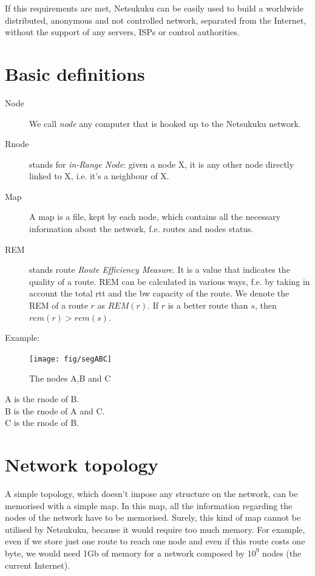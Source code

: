\documentclass[a4paper]{article}
\begin{document}
If this requirements are met, Netsukuku can be easily used to build a worldwide
distributed, anonymous and not controlled network, separated from the
Internet, without the support of any servers, ISPs or control authorities.

\section{Basic definitions}

\begin{description}
	\item[Node] We call \emph{node} any computer that is hooked up to the
		Netsukuku network.
	\item[Rnode] stands for \emph{in-Range Node}: given a node X, it is any other
		node directly linked to X, i.e. it's a neighbour of X.
	\item[Map] A map is a file, kept by each node, which contains all the
		necessary information about the network, f.e. routes and nodes
		status.
	\item[REM] stands route \emph{Route Efficiency Measure}. It is 
		a value that indicates the quality of a route. 
		REM can be calculated in various ways, f.e. by taking in
		account the total rtt and the bw capacity of the route.  We denote the REM of
a route $r$ as $REM(r)$. If $r$ is a better route than $s$, then
$rem(r)>rem(s)$.

\end{description}
Example:\\
\begin{figure}[h]
	\begin{center}
		\texttt{[image: fig/segABC]}
	\end{center}
	\caption{The nodes A,B and C}
\end{figure}
A is the rnode of B.\\
B is the rnode of A and C.\\
C is the rnode of B.

\section{Network topology}
\label{sec:net_topology}

A simple topology, which doesn't impose any structure on the network, can be
memorised with a simple map. In this map, all the information regarding the
nodes of the network have to be memorised. Surely, this kind of map cannot be
utilised by Netsukuku, because it would require too much memory.
For example, even if we store just one route to reach one node and even if
this route costs one byte, we would need 1Gb of memory for a network composed
by $10^9$ nodes (the current Internet).
\end{document}
